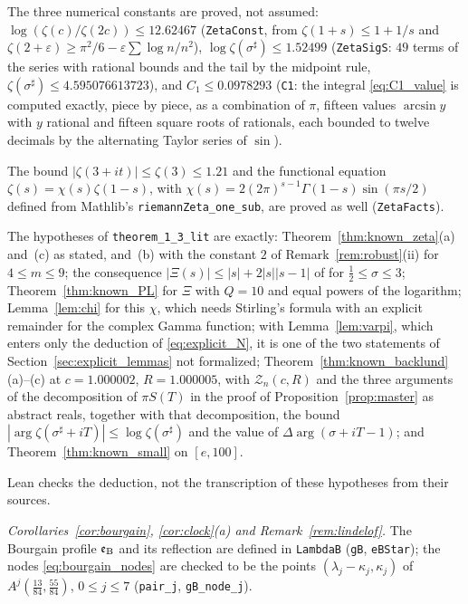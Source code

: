 \documentclass[11pt,a4paper]{article}
\makeatletter
\numberwithin{equation}{section}
\DeclareRobustCommand{\CGref}[1]{\ref{#1}}
\DeclareRobustCommand{\CGeqref}[1]{\eqref{#1}}
\DeclareRobustCommand{\CGcite}[2][]{\if\relax\detokenize{#1}\relax\cite{#2}\else\cite[#1]{#2}\fi}
\let\CG@origref\ref
\let\CG@origeqref\eqref
\newcommand{\CG@gettip}[1]{\@ifundefined{CGTip@#1}{#1}{\csname CGTip@#1\endcsname}}
\newcommand{\CG@getbib}[1]{\@ifundefined{CGBib@#1}{#1}{\csname CGBib@#1\endcsname}}
\DeclareRobustCommand{\CGref}[1]{\pdftooltip{\CG@origref{#1}}{\CG@gettip{#1}}}
\DeclareRobustCommand{\CGeqref}[1]{\pdftooltip{\CG@origeqref{#1}}{\CG@gettip{#1}}}
\DeclareRobustCommand{\CGcite}[2][]{\pdftooltip{\if\relax\detokenize{#1}\relax\cite{#2}\else\cite[#1]{#2}\fi}{\CG@getbib{#2}}}
\theoremstyle{definition}
\theoremstyle{remark}
\newcommand{\eB}{\mathfrak e_{\rm B}}
\makeatother
\begin{document}
The three numerical constants are proved, not assumed: $\log(\zeta(c)/\zeta(2c))\le12.62467$ (\texttt{ZetaConst}, from $\zeta(1+s)\le1+1/s$ and $\zeta(2+\varepsilon)\ge\pi^2/6-\varepsilon\sum\log n/n^2$), $\log\zeta(\sigma^\sharp)\le1.52499$ (\texttt{ZetaSigS}: $49$ terms of the series with rational bounds and the tail by the midpoint rule, $\zeta(\sigma^\sharp)\le4.595076613723$), and $C_1\le0.0978293$ (\texttt{C1}: the integral \CGeqref{eq:C1_value} is computed exactly, piece by piece, as a combination of $\pi$, fifteen values $\arcsin y$ with $y$ rational and fifteen square roots of rationals, each bounded to twelve decimals by the alternating Taylor series of $\sin$).

The bound $|\zeta(3+it)|\le\zeta(3)\le1.21$ and the functional equation $\zeta(s)=\chi(s)\zeta(1-s)$, with $\chi(s)=2(2\pi)^{s-1}\Gamma(1-s)\sin(\pi s/2)$ defined from Mathlib's \texttt{riemannZeta\_one\_sub}, are proved as well (\texttt{ZetaFacts}).

The hypotheses of \texttt{theorem\_1\_3\_lit} are exactly: Theorem~\CGref{thm:known_zeta}(a) and~(c) as stated, and~(b) with the constant $2$ of Remark~\CGref{rem:robust}(ii) for $4\le m\le9$; the consequence $|\Xi(s)|\le|s|+2|s||s-1|$ of \CGcite[(2.1.4)]{Titchmarsh1986} for $\frac12\le\sigma\le3$; Theorem~\CGref{thm:known_PL} for $\Xi$ with $Q=10$ and equal powers of the logarithm; Lemma~\CGref{lem:chi} for this $\chi$, which needs Stirling's formula with an explicit remainder for the complex Gamma function; with Lemma~\CGref{lem:varpi}, which enters only the deduction of \CGeqref{eq:explicit_N}, it is one of the two statements of Section~\CGref{sec:explicit_lemmas} not formalized; Theorem~\CGref{thm:known_backlund}(a)--(c) at $c=1.000002$, $R=1.000005$, with $\mathcal Z_n(c,R)$ and the three arguments of the decomposition of $\pi S(T)$ in the proof of Proposition~\CGref{prop:master} as abstract reals, together with that decomposition, the bound $|\arg\zeta(\sigma^\sharp+iT)|\le\log\zeta(\sigma^\sharp)$ and the value of $\Delta\arg(\sigma+iT-1)$; and Theorem~\CGref{thm:known_small} on $[e,100]$.

Lean checks the deduction, not the transcription of these hypotheses from their sources.

\emph{Corollaries~\CGref{cor:bourgain}, \CGref{cor:clock}(a) and Remark~\CGref{rem:lindelof}.} The Bourgain profile $\eB$ and its reflection are defined in \texttt{LambdaB} (\texttt{gB}, \texttt{eBStar}); the nodes \CGeqref{eq:bourgain_nodes} are checked to be the points $(\lambda_j-\kappa_j,\kappa_j)$ of $A^j(\frac{13}{84},\frac{55}{84})$, $0\le j\le7$ (\texttt{pair\_j}, \texttt{gB\_node\_j}).
\end{document}
